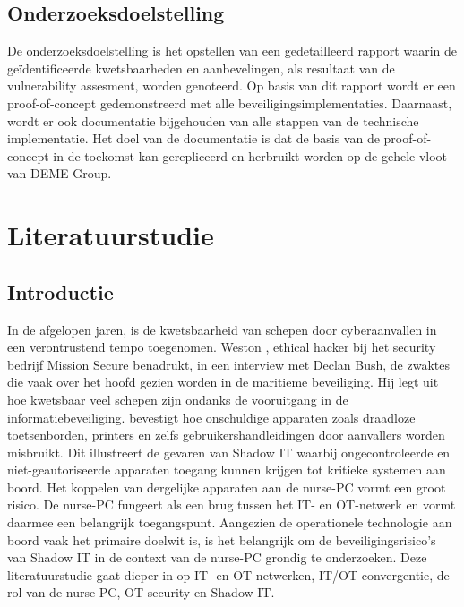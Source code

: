 \subsection{Onderzoeksdoelstelling}
De onderzoeksdoelstelling is het opstellen van een gedetailleerd rapport waarin de geïdentificeerde kwetsbaarheden en aanbevelingen, als resultaat van de vulnerability assesment, worden genoteerd.
Op basis van dit rapport wordt er een proof-of-concept gedemonstreerd met alle beveiligingsimplementaties.
Daarnaast, wordt er ook documentatie bijgehouden van alle stappen van de technische implementatie.
Het doel van de documentatie is dat de basis van de proof-of-concept in de toekomst kan gerepliceerd en herbruikt worden op de gehele vloot van DEME-Group.



\section{Literatuurstudie}%
\label{sec:literatuurstudie}
\subsection{Introductie}
In de afgelopen jaren, is de kwetsbaarheid van schepen door cyberaanvallen in een verontrustend tempo toegenomen. Weston \textcite{Hecker2021}, ethical hacker bij het security bedrijf 
Mission Secure benadrukt, in een interview met Declan Bush, de zwaktes die vaak over het hoofd gezien worden in de maritieme beveiliging. Hij
legt uit hoe kwetsbaar veel schepen zijn ondanks de vooruitgang in de informatiebeveiliging. \textcite{Hecker2021} bevestigt hoe onschuldige apparaten zoals draadloze toetsenborden, printers en 
zelfs gebruikershandleidingen door aanvallers worden misbruikt. Dit illustreert de gevaren van Shadow IT waarbij ongecontroleerde en niet-geautoriseerde apparaten toegang kunnen krijgen tot kritieke systemen aan boord. 
Het koppelen van dergelijke apparaten aan de nurse-PC vormt een groot risico. De nurse-PC fungeert als een brug tussen het IT- en OT-netwerk en vormt daarmee een belangrijk toegangspunt. 
Aangezien de operationele technologie aan boord vaak het primaire doelwit is, is het belangrijk om de beveiligingsrisico's van Shadow IT in de context van de nurse-PC grondig te onderzoeken.
Deze literatuurstudie gaat dieper in op IT- en OT netwerken, IT/OT-convergentie, de rol van de nurse-PC, OT-security en Shadow IT.

